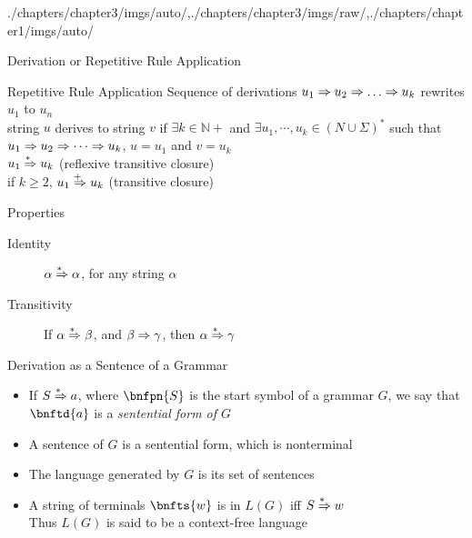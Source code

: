 \begin{graphicspathcontext}{{./chapters/chapter3/imgs/auto/},{./chapters/chapter3/imgs/raw/},{./chapters/chapter1/imgs/auto/}}
\begin{bibunit}[apalike]
\begin{frame}{Derivation or Repetitive Rule Application}
	\begin{definitionblock}{Repetitive Rule Application}
		Sequence of derivations $u_1 \deriv u_2 \deriv \dots \deriv u_k$ rewrites $u_1$ to $u_n$ \\[.2cm]
		 string $u$ derives to string $v$ if $\exists k\in\mathbb{N}+$ and $\exists u_{1},\cdots ,u_{k}\in (N\cup \Sigma)^{*}$ such that $u_{1}\Rightarrow u_{2}\Rightarrow \cdots \Rightarrow u_{k}$, $u=u_1$ and $v=u_k$ \\[.2cm]
		 $u_1 \overset{*\hspace{.4em}}{\Rightarrow} u_k$ (reflexive transitive closure)\\
		 if $k\ge2$, $u_1 \overset{+\hspace{.4em}}{\Rightarrow} u_k$ (transitive closure)
	\end{definitionblock}
	\begin{block}{Properties}
		\begin{description}
		\item[Identity] $\alpha\overset{*\hspace{.4em}}{\Rightarrow}\alpha$, for any string $\alpha$
		\item[Transitivity] If $\alpha\overset{*\hspace{.4em}}{\Rightarrow}\beta$, and $\beta\Rightarrow\gamma$, then $\alpha\overset{*\hspace{.4em}}{\Rightarrow}\gamma$
		\end{description}
	\end{block}
\end{frame}

\begin{frame}[background=8]{Derivation as a Sentence of a Grammar}
	\begin{itemize}
	\item If $S \overset{*\hspace{.4em}}{\Rightarrow} a$, where $\bnfpn{S}$ is the start symbol of a grammar $G$, we say that $\bnftd{a}$ is a \emph{sentential form of $G$}
	\vfill
	\item A sentence of $G$ is a sentential form, which is nonterminal
	\vfill
	\item The language generated by $G$ is its set of sentences
	\vfill
	\item A string of terminals $\bnfts{w}$ is in $L(G)$ iff $S \overset{*\hspace{.4em}}{\Rightarrow} w$ \\
		Thus $L(G)$ is said to be a context-free language
	\end{itemize}
\end{frame}


\end{bibunit}
\end{graphicspathcontext}
